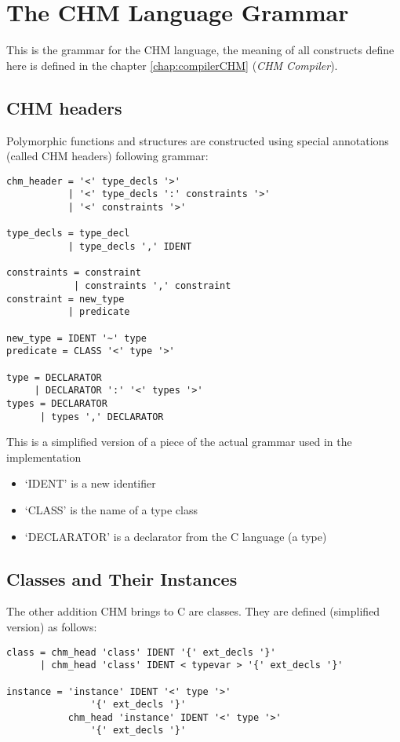 \chapter{The CHM Language Grammar}

This is the grammar for the CHM language, the meaning of all constructs define here is defined in the chapter \ref{chap:compilerCHM} (\emph{CHM Compiler}).

\section{CHM headers}

Polymorphic functions and structures are constructed using special annotations (called CHM headers) following grammar:

\begin{lstlisting}
chm_header = '<' type_decls '>'
           | '<' type_decls ':' constraints '>'
           | '<' constraints '>'

type_decls = type_decl
           | type_decls ',' IDENT

constraints = constraint
            | constraints ',' constraint
constraint = new_type
           | predicate

new_type = IDENT '~' type
predicate = CLASS '<' type '>'

type = DECLARATOR
     | DECLARATOR ':' '<' types '>'
types = DECLARATOR
      | types ',' DECLARATOR
\end{lstlisting}

This is a simplified version of a piece of the actual grammar used in the implementation

\begin{itemize}
    \item `IDENT' is a new identifier
    \item `CLASS' is the name of a type class
    \item `DECLARATOR' is a declarator from the C language (a type)
\end{itemize}

\section{Classes and Their Instances}

The other addition CHM brings to C are classes. They are defined (simplified version) as follows:

\begin{lstlisting}
class = chm_head 'class' IDENT '{' ext_decls '}'
      | chm_head 'class' IDENT < typevar > '{' ext_decls '}'

instance = 'instance' IDENT '<' type '>'
               '{' ext_decls '}'
           chm_head 'instance' IDENT '<' type '>'
               '{' ext_decls '}'
\end{lstlisting}

